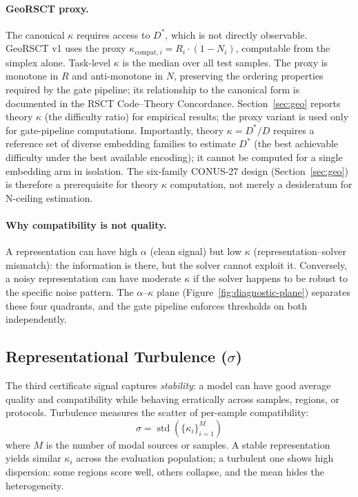 \documentclass{article}
\begin{document}
\paragraph{GeoRSCT proxy.} The canonical $\kappa$ requires access to $D^*$, which is not directly observable. GeoRSCT v1 uses the proxy $\kappa_{\text{compat},i} = R_i \cdot (1 - N_i)$, computable from the simplex alone. Task-level $\kappa$ is the median over all test samples. The proxy is monotone in $R$ and anti-monotone in $N$, preserving the ordering properties required by the gate pipeline; its relationship to the canonical form is documented in the RSCT Code--Theory Concordance. Section~\ref{sec:geo} reports theory $\kappa$ (the difficulty ratio) for empirical results; the proxy variant is used only for gate-pipeline computations. Importantly, theory $\kappa = D^*/D$ requires a reference set of diverse embedding families to estimate $D^*$ (the best achievable difficulty under the best available encoding); it cannot be computed for a single embedding arm in isolation. The six-family CONUS-27 design (Section~\ref{sec:geo}) is therefore a prerequisite for theory $\kappa$ computation, not merely a desideratum for N-ceiling estimation.

\paragraph{Why compatibility is not quality.} A representation can have high $\alpha$ (clean signal) but low $\kappa$ (representation--solver mismatch): the information is there, but the solver cannot exploit it. Conversely, a noisy representation can have moderate $\kappa$ if the solver happens to be robust to the specific noise pattern. The $\alpha$--$\kappa$ plane (Figure~\ref{fig:diagnostic-plane}) separates these four quadrants, and the gate pipeline enforces thresholds on both independently.

\subsection{\texorpdfstring{Representational Turbulence ($\sigma$)}{Representational Turbulence (sigma)}}

The third certificate signal captures \emph{stability}: a model can have good average quality and compatibility while behaving erratically across samples, regions, or protocols. Turbulence measures the scatter of per-sample compatibility:
\begin{equation}
\sigma = \operatorname{std}(\{\kappa_i\}_{i=1}^M)
\end{equation}
where $M$ is the number of modal sources or samples. A stable representation yields similar $\kappa_i$ across the evaluation population; a turbulent one shows high dispersion: some regions score well, others collapse, and the mean hides the heterogeneity.
\end{document}
